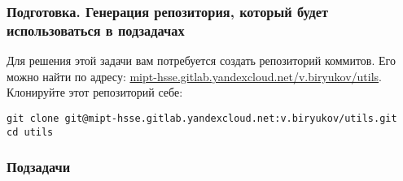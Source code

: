 \documentclass{article}
\begin{document}
\subsubsection*{Подготовка. Генерация репозитория, который будет использоваться в подзадачах}
Для решения этой задачи вам потребуется создать репозиторий коммитов. 
Его можно найти по адресу:
\href{https://mipt-hsse.gitlab.yandexcloud.net/v.biryukov/utils}{mipt-hsse.gitlab.yandexcloud.net/v.biryukov/utils}. Клонируйте этот репозиторий себе:
\begin{lstlisting}
git clone git@mipt-hsse.gitlab.yandexcloud.net:v.biryukov/utils.git
cd utils
\end{lstlisting}

\subsubsection*{Подзадачи}
\end{document}
